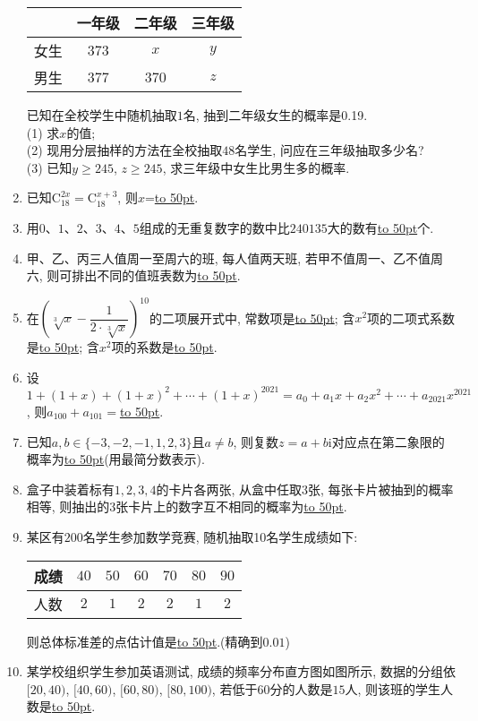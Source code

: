 \documentclass[10pt,a4paper]{article}
\newcommand{\blank}[1]{\underline{\hbox to #1pt{}}}
\begin{document}
\begin{enumerate}[1.]
\begin{center}
    \begin{tabular}{|c|c|c|c|}
        \hline
        & 一年级 & 二年级 & 三年级\\ \hline
        女生 & $373$ & $x$ & $y$ \\ \hline
        男生 & $377$ & $370$ & $z$ \\ \hline
    \end{tabular}
\end{center}
已知在全校学生中随机抽取$1$名, 抽到二年级女生的概率是0.19.\\
(1) 求$x$的值;\\
(2) 现用分层抽样的方法在全校抽取$48$名学生, 问应在三年级抽取多少名?\\
(3) 已知$y\ge 245$, $z\ge 245$, 求三年级中女生比男生多的概率.
\item 已知$\mathrm{C}_{18}^{2x}=\mathrm{C}_{18}^{x+3}$, 则$x$=\blank{50}.
\item 用$0$、$1$、$2$、$3$、$4$、$5$组成的无重复数字的数中比$240135$大的数有\blank{50}个.
\item 甲、乙、丙三人值周一至周六的班, 每人值两天班, 若甲不值周一、乙不值周六, 则可排出不同的值班表数为\blank{50}.
\item 在$(\sqrt[3]x-\dfrac 1{2\cdot \sqrt[3]x})^{10}$的二项展开式中, 常数项是\blank{50}; 含$x^2$项的二项式系数是\blank{50}; 含$x^2$项的系数是\blank{50}.
\item 设$1+(1+x)+(1+x)^2+\cdots+(1+x)^{2021}=a_0+a_1x+a_2x^2+\cdots +a_{2021}x^{2021}$, 则$a_{100}+a_{101}=$\blank{50}.
\item 已知$a,b\in \{-3,-2,-1,1,2,3\}$且$a\ne b$, 则复数$z=a+b\mathrm{i}$对应点在第二象限的概率为\blank{50}(用最简分数表示).
\item 盒子中装着标有$1,2,3,4$的卡片各两张, 从盒中任取$3$张, 每张卡片被抽到的概率相等, 则抽出的$3$张卡片上的数字互不相同的概率为\blank{50}.
\item 某区有$200$名学生参加数学竞赛, 随机抽取10名学生成绩如下:
\begin{center}
    \begin{tabular}{|c|c|c|c|c|c|c|}
        \hline
        成绩 & $40$ & $50$ & $60$ & $70$ & $80$ & $90$\\ \hline
        人数 & $2$ & $1$ & $2$ & $2$ & $1$ & $2$ \\ \hline        
    \end{tabular}
\end{center}
则总体标准差的点估计值是\blank{50}.(精确到$0.01$)
\item 某学校组织学生参加英语测试, 成绩的频率分布直方图如图所示, 数据的分组依$[20,40)$, $[40,60)$, $[60,80)$, $[80,100)$, 若低于$60$分的人数是$15$人, 则该班的学生人数是\blank{50}.

\end{enumerate}
\end{document}
